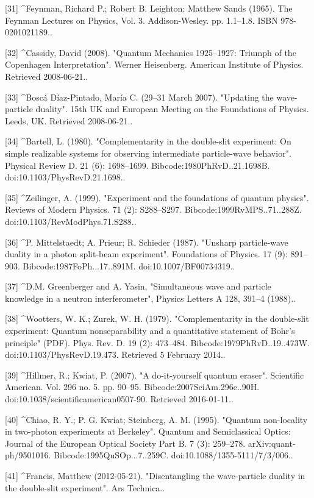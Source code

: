 [31]
^Feynman, Richard P.; Robert B. Leighton; Matthew Sands (1965). The Feynman Lectures on Physics, Vol. 3. Addison-Wesley. pp. 1.1–1.8. ISBN 978-0201021189..

[32]
^Cassidy, David (2008). "Quantum Mechanics 1925–1927: Triumph of the Copenhagen Interpretation". Werner Heisenberg. American Institute of Physics. Retrieved 2008-06-21..

[33]
^Boscá Díaz-Pintado, María C. (29–31 March 2007). "Updating the wave-particle duality". 15th UK and European Meeting on the Foundations of Physics. Leeds, UK. Retrieved 2008-06-21..

[34]
^Bartell, L. (1980). "Complementarity in the double-slit experiment: On simple realizable systems for observing intermediate particle-wave behavior". Physical Review D. 21 (6): 1698–1699. Bibcode:1980PhRvD..21.1698B. doi:10.1103/PhysRevD.21.1698..

[35]
^Zeilinger, A. (1999). "Experiment and the foundations of quantum physics". Reviews of Modern Physics. 71 (2): S288–S297. Bibcode:1999RvMPS..71..288Z. doi:10.1103/RevModPhys.71.S288..

[36]
^P. Mittelstaedt; A. Prieur; R. Schieder (1987). "Unsharp particle-wave duality in a photon split-beam experiment". Foundations of Physics. 17 (9): 891–903. Bibcode:1987FoPh...17..891M. doi:10.1007/BF00734319..

[37]
^D.M. Greenberger and A. Yasin, "Simultaneous wave and particle knowledge in a neutron interferometer", Physics Letters A 128, 391–4 (1988)..

[38]
^Wootters, W. K.; Zurek, W. H. (1979). "Complementarity in the double-slit experiment: Quantum nonseparability and a quantitative statement of Bohr's principle" (PDF). Phys. Rev. D. 19 (2): 473–484. Bibcode:1979PhRvD..19..473W. doi:10.1103/PhysRevD.19.473. Retrieved 5 February 2014..

[39]
^Hillmer, R.; Kwiat, P. (2007). "A do-it-yourself quantum eraser". Scientific American. Vol. 296 no. 5. pp. 90–95. Bibcode:2007SciAm.296e..90H. doi:10.1038/scientificamerican0507-90. Retrieved 2016-01-11..

[40]
^Chiao, R. Y.; P. G. Kwiat; Steinberg, A. M. (1995). "Quantum non-locality in two-photon experiments at Berkeley". Quantum and Semiclassical Optics: Journal of the European Optical Society Part B. 7 (3): 259–278. arXiv:quant-ph/9501016. Bibcode:1995QuSOp...7..259C. doi:10.1088/1355-5111/7/3/006..

[41]
^Francis, Matthew (2012-05-21). "Disentangling the wave-particle duality in the double-slit experiment". Ars Technica..

